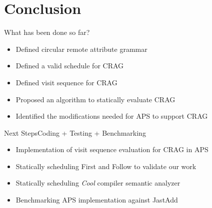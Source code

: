 \section{Conclusion}

\begin{frame}{What has been done so far?}

\begin{itemize}
    \item Defined circular remote attribute grammar
    \item Defined a valid schedule for CRAG
    \item Defined visit sequence for CRAG
    \item \alert{Proposed} an algorithm to statically evaluate CRAG
    \item \alert{Identified} the modifications needed for APS to support CRAG
\end{itemize}
\end{frame}

\begin{frame}{Next Steps}{Coding + Testing + Benchmarking}

\begin{itemize}
    \item \alert{Implementation} of visit sequence evaluation for CRAG in APS
    \item Statically scheduling First and Follow to validate our work
    \item Statically scheduling \emph{Cool} compiler semantic analyzer
    \item Benchmarking APS implementation against JastAdd
\end{itemize}

\end{frame}

